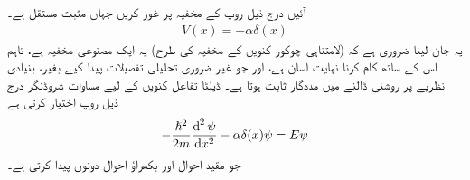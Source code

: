 آئیں درج ذیل روپ کے مخفیہ پر غور کریں جہاں    مثبت مستقل ہے۔
\begin{align}\label{مساوات_شروڈنگر_کنواں_مخفیہ}
V(x)=-\alpha\delta(x)
\end{align}
یہ جان لینا ضروری ہے کہ (لامتناہی چوکور کنویں کے مخفیہ کی طرح)  یہ ایک مصنوعی مخفیہ ہے، تاہم اس کے ساتھ کام کرنا نہایت آسان ہے، اور جو غیر ضروری     تحلیلی   تفصیلات پیدا کیے بغیر، بنیادی نظریے  پر روشنی ڈالنے میں مددگار ثابت ہوتا ہے۔ ڈیلٹا تفاعل کنویں کے لیے مساوات شروڈنگر درج ذیل روپ اختیار کرتی ہے 
\begin{align}
-\frac{\hslash^{2}}{2m}\frac{\dif^{\,2}\psi}{\dif{x^{2}}}-\alpha\delta(x)\psi=E\psi
\end{align} 
جو مقید احوال  اور بکھراؤ احوال   دونوں پیدا کرتی ہے۔

